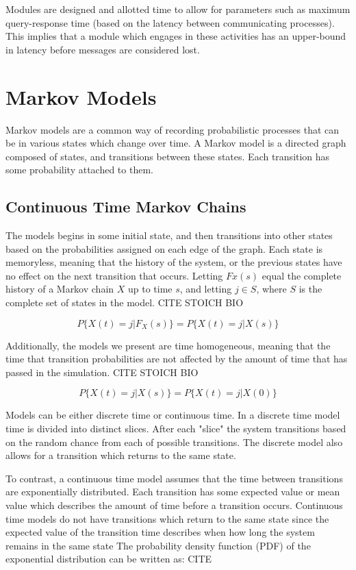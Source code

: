 Modules are designed and allotted time to allow for parameters such as maximum
query-response time (based on the latency between communicating processes). 
This implies that a module which engages in these activities has an
upper-bound in latency before messages are considered lost.

\section{Markov Models}

Markov models are a common way of recording probabilistic processes that can
be in various states which change over time. A Markov model is a directed
graph composed of states, and transitions between these states. Each
transition has some probability attached to them.

\subsection{Continuous Time Markov Chains}

The models begins in some initial state, and then transitions into other states
based on the probabilities assigned on each edge of the graph. Each state is
memoryless, meaning that the history of the system, or the previous states have
no effect on the next transition that occurs. Letting $Fx(s)$ equal the complete
history of a Markov chain $X$ up to time $s$, and letting $j \in S$, where $S$
is the complete set of states in the model. CITE STOICH BIO

\begin{equation}
P\{ X(t)=j | F_X(s) \} = P\{ X(t)=j | X(s) \}
\end{equation}

Additionally, the models we present are time homogeneous, meaning that the
time that transition probabilities are not affected by the amount of time that
has passed in the simulation. CITE STOICH BIO

\begin{equation}
P\{ X(t)=j | X(s) \} = P\{ X(t)=j | X(0) \}
\end{equation}

Models can be either discrete time or continuous time. In a discrete time model
time is divided into distinct slices. After each "slice" the system transitions
based on the random chance from each of possible transitions. The discrete model
also allows for a transition which returns to the same state.

To contrast, a continuous time model assumes that the time between transitions
are exponentially distributed. Each transition has some expected value or mean
value which describes the amount of time before a transition occurs. Continuous
time models do not have transitions which return to the same state since the
expected value of the transition time describes when how long the system 
remains in the same state The probability density
function (PDF) of the exponential distribution can be written as: CITE

